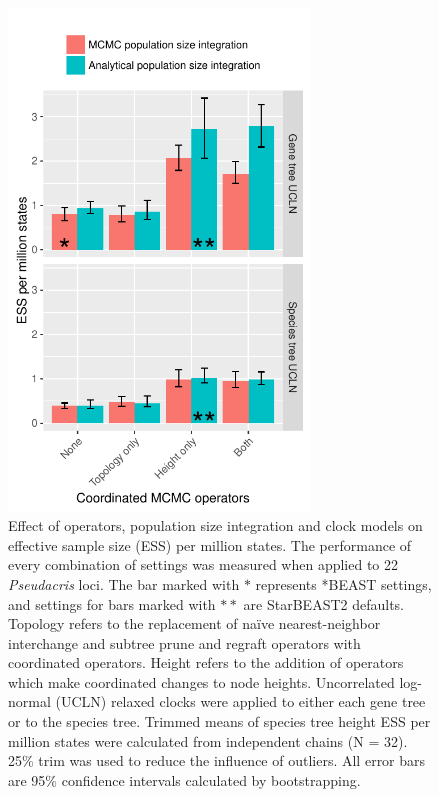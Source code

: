 \documentclass[nogrid]{MBE}%
\begin{document}
\begin{figure}[htb!]
\centering
\includegraphics[width=8cm]{speciesTreeHeight_ess_per_mstates.pdf}
\caption
{Effect of operators, population size integration and clock models on effective
sample size (ESS) per million states. The performance of every combination of
settings was measured when applied to 22 \textit{Pseudacris} loci. The bar marked with $\ast$ represents *BEAST
settings, and settings for bars marked with $\ast\ast$ are StarBEAST2 defaults. Topology refers to the
replacement of na\"ive nearest-neighbor interchange and subtree prune and regraft operators with coordinated operators. Height
refers to the addition of operators which make coordinated changes to
node heights. Uncorrelated log-normal (UCLN) relaxed clocks were applied
to either each gene tree or to the species tree. Trimmed means
of species tree height ESS per million states were calculated from
independent chains (N = 32). 25\% trim was used to reduce the influence
of outliers. All error bars are 95\% confidence intervals calculated by
bootstrapping.}
\label{fig:realEssPerMstates}
\end{figure}
\end{document}
